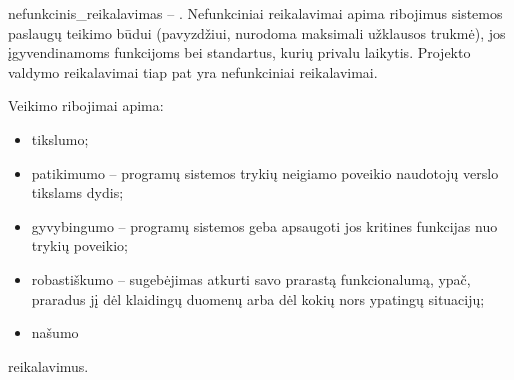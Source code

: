 \Gls{nefunkcinis_reikalavimas} – .
Nefunkciniai reikalavimai apima ribojimus sistemos paslaugų teikimo būdui
(pavyzdžiui, nurodoma maksimali užklausos trukmė), jos įgyvendinamoms
funkcijoms bei standartus, kurių privalu laikytis. Projekto valdymo
reikalavimai tiap pat yra nefunkciniai reikalavimai.


Veikimo ribojimai apima:
\begin{itemize}
  \item tikslumo;
  \item patikimumo – programų sistemos trykių neigiamo poveikio naudotojų
    verslo tikslams dydis;
  \item gyvybingumo – programų sistemos geba apsaugoti jos kritines
    funkcijas nuo trykių poveikio;
  \item robastiškumo – sugebėjimas atkurti savo prarastą funkcionalumą,
    ypač, praradus jį dėl klaidingų duomenų arba dėl kokių nors ypatingų
    situacijų;
  \item našumo
\end{itemize}
reikalavimus.

